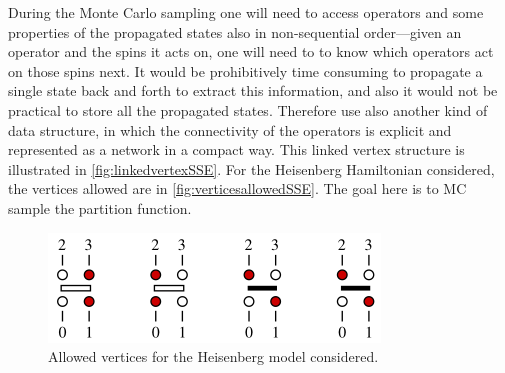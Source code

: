 		During the Monte Carlo sampling one will need to access operators and some properties of the propagated states also in non-sequential order—given an operator and the spins it acts on, one will need to to know which operators act on those spins next. It would be prohibitively time consuming to propagate a single state back and forth to extract this information, and also it would not be practical to store all the propagated states. Therefore use also another kind of data structure, in which the connectivity of the operators is explicit and represented as a network in a compact way. This linked vertex	structure is illustrated in \autoref{fig:linkedvertexSSE}. For the Heisenberg Hamiltonian considered, the vertices allowed are in \autoref{fig:verticesallowedSSE}. The goal here is to MC sample the partition function. 

		\begin{figure}[h!]
            \centering
            \includegraphics[scale=0.7]{graphs/verticesallowedSSE.png}
            \caption{Allowed vertices for the Heisenberg model considered.}
            \label{fig:verticesallowedSSE}
        \end{figure}

